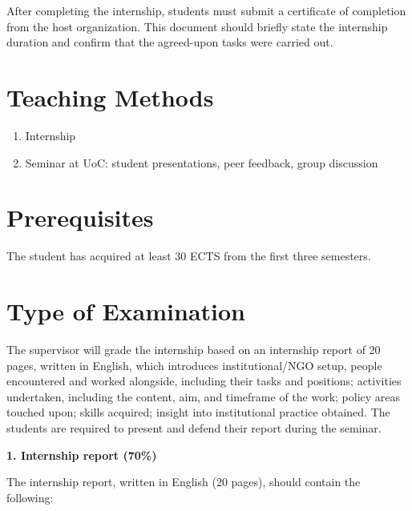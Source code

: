 \documentclass[
  letterpaper,
  10pt,
  openany]{book}
\providecommand{\tightlist}{%
  \setlength{\itemsep}{0pt}\setlength{\parskip}{0pt}}\usepackage{longtable,booktabs,array}
\begin{document}
After completing the internship, students must submit a certificate of
completion from the host organization. This document should briefly
state the internship duration and confirm that the agreed-upon tasks
were carried out.

\section*{Teaching Methods}\label{teaching-methods-4}


\begin{enumerate}
\def\labelenumi{\alph{enumi})}
\tightlist
\item
  Internship\\
\item
  Seminar at UoC: student presentations, peer feedback, group discussion
\end{enumerate}

\section*{Prerequisites}\label{prerequisites-4}


The student has acquired at least 30 ECTS from the first three
semesters.

\section*{Type of Examination}\label{type-of-examination-4}


The supervisor will grade the internship based on an internship report
of 20 pages, written in English, which introduces institutional/NGO
setup, people encountered and worked alongside, including their tasks
and positions; activities undertaken, including the content, aim, and
timeframe of the work; policy areas touched upon; skills acquired;
insight into institutional practice obtained. The students are required
to present and defend their report during the seminar.

\textbf{1. Internship report (70\%)}

The internship report, written in English (20 pages), should contain the
following:
\end{document}
